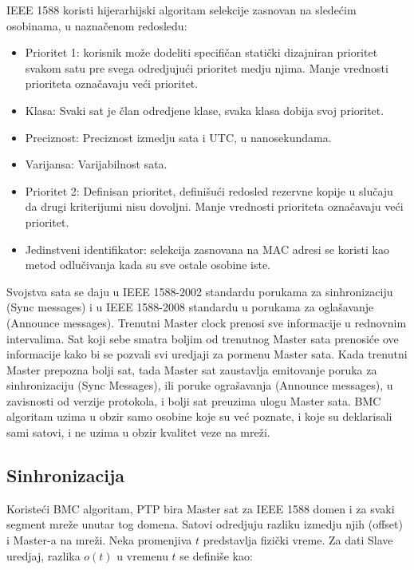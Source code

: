 \documentclass[a4paper,12pt, master]{etf}
\begin{document}
	IEEE 1588 koristi hijerarhijski algoritam selekcije zasnovan na
	slede\'{c}im osobinama, u nazna\v{c}enom redosledu:

	\begin{itemize}
		\item Prioritet 1: korisnik mo\v{z}e dodeliti specifi\v{c}an
		stati\v{c}ki dizajniran prioritet svakom satu pre svega odredjuju\'{c}i
		prioritet medju njima. Manje vrednosti prioriteta ozna\v{c}avaju
		ve\'{c}i prioritet.
		\item Klasa: Svaki sat je \v{c}lan odredjene klase, svaka klasa dobija
		svoj prioritet.
		\item Preciznost: Preciznost izmedju sata i UTC, u nanosekundama.
		\item Varijansa: Varijabilnost sata.
		\item Prioritet 2: Definisan prioritet, defini\v{s}u\'{c}i redosled
		rezervne kopije u slu\v{c}aju da drugi kriterijumi nisu dovoljni. Manje
		vrednosti prioriteta ozna\v{c}avaju ve\'{c}i prioritet.
		\item Jedinstveni identifikator: selekcija zasnovana na MAC adresi se
		koristi kao metod odlu\v{c}ivanja kada su sve ostale osobine iste.
	\end{itemize}

	Svojstva sata se daju u IEEE 1588-2002 standardu porukama za sinhronizaciju
	(Sync messages) i u	IEEE 1588-2008 standardu u porukama za ogla\v{s}avanje
	(Announce messages). Trenutni Master clock prenosi sve informacije u
	rednovnim intervalima. Sat koji sebe smatra boljim od trenutnog Master
	sata prenosi\'{c}e ove informacije kako bi se pozvali svi uredjaji za
	pormenu Master sata. Kada trenutni Master prepozna bolji sat, tada Master
	sat	zaustavlja emitovanje poruka za sinhronizaciju (Sync Messages), ili
	poruke ogra\v{s}avanja (Announce messages), u zavisnosti od verzije
	protokola, i bolji sat preuzima ulogu Master sata. BMC algoritam uzima u
	obzir samo osobine koje su ve\'{c} poznate, i koje su deklarisali sami
	satovi, i ne uzima u obzir kvalitet veze na mre\v{z}i.

	\subsection{Sinhronizacija}

	Koriste\'{c}i BMC algoritam, PTP bira Master sat za IEEE 1588 domen i za
	svaki segment mre\v{z}e unutar tog domena. Satovi odredjuju razliku izmedju
	njih (offset) i Master-a na mre\v{z}i. Neka promenjiva $t$ predstavlja
	fizi\v{c}ki vreme. Za dati Slave uredjaj, razlika $o(t)$ u vremenu $t$ se
	defini\v{s}e kao:
\end{document}
